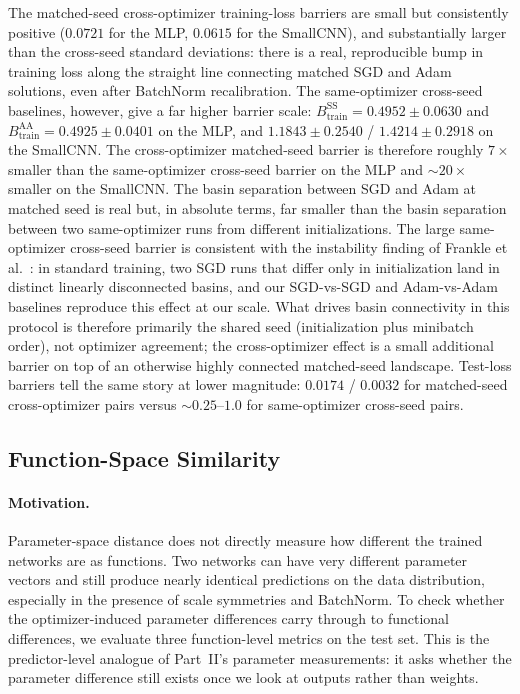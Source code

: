 \documentclass[11pt]{article}
\begin{document}
The matched-seed cross-optimizer training-loss barriers are small but consistently positive ($0.0721$ for the MLP, $0.0615$ for the SmallCNN), and substantially larger than the cross-seed standard deviations: there is a real, reproducible bump in training loss along the straight line connecting matched SGD and Adam solutions, even after BatchNorm recalibration. The same-optimizer cross-seed baselines, however, give a far higher barrier scale: $B_{\text{train}}^{\mathrm{SS}} = 0.4952 \pm 0.0630$ and $B_{\text{train}}^{\mathrm{AA}} = 0.4925 \pm 0.0401$ on the MLP, and $1.1843 \pm 0.2540$ / $1.4214 \pm 0.2918$ on the SmallCNN. The cross-optimizer matched-seed barrier is therefore roughly $7\times$ smaller than the same-optimizer cross-seed barrier on the MLP and $\sim 20\times$ smaller on the SmallCNN. The basin separation between SGD and Adam at matched seed is real but, in absolute terms, far smaller than the basin separation between two same-optimizer runs from different initializations. The large same-optimizer cross-seed barrier is consistent with the instability finding of Frankle et al.~\cite{frankle2020linear}: in standard training, two SGD runs that differ only in initialization land in distinct linearly disconnected basins, and our SGD-vs-SGD and Adam-vs-Adam baselines reproduce this effect at our scale. What drives basin connectivity in this protocol is therefore primarily the shared seed (initialization plus minibatch order), not optimizer agreement; the cross-optimizer effect is a small additional barrier on top of an otherwise highly connected matched-seed landscape. Test-loss barriers tell the same story at lower magnitude: $0.0174$ / $0.0032$ for matched-seed cross-optimizer pairs versus $\sim 0.25$--$1.0$ for same-optimizer cross-seed pairs.

\FloatBarrier

\subsection{Function-Space Similarity}
\label{sec:function-space}

\paragraph{Motivation.} Parameter-space distance does not directly measure how different the trained networks are as functions. Two networks can have very different parameter vectors and still produce nearly identical predictions on the data distribution, especially in the presence of scale symmetries and BatchNorm. To check whether the optimizer-induced parameter differences carry through to functional differences, we evaluate three function-level metrics on the test set. This is the predictor-level analogue of Part~II's parameter measurements: it asks whether the parameter difference still exists once we look at outputs rather than weights.
\end{document}
